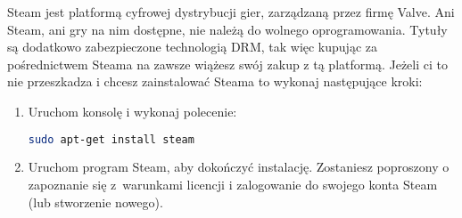 Steam jest platformą cyfrowej dystrybucji gier, zarządzaną przez firmę Valve. Ani Steam, ani gry na nim dostępne, nie należą do wolnego oprogramowania. Tytuły są dodatkowo zabezpieczone technologią DRM, tak więc kupując za pośrednictwem Steama na zawsze wiążesz swój zakup z tą platformą. Jeżeli ci to nie przeszkadza i chcesz zainstalować Steama to wykonaj następujące kroki:
\begin{enumerate}
\item Uruchom konsolę  i wykonaj polecenie:
\begin{lstlisting}[language=bash]
sudo apt-get install steam
\end{lstlisting}
\item Uruchom program Steam, aby dokończyć instalację. Zostaniesz poproszony o zapoznanie się z~warunkami licencji i zalogowanie do swojego konta Steam (lub stworzenie nowego).
\end{enumerate}

